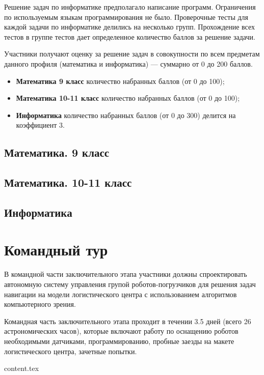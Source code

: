 \documentclass[a4paper,12pt,oneside]{book}
\begin{document}
Решение задач по информатике предполагало написание программ.
Ограничения по используемым языкам программирования не было.
Проверочные тесты для каждой задачи по информатике делились на
несколько групп. Прохождение всех тестов в группе тестов дает
определенное количество баллов за решение задачи.

Участники получают оценку за решение задач в совокупности по
всем предметам данного профиля (математика и информатика) ---
суммарно от 0 до 200 баллов.

\begin{itemize}
    \item {\bf Математика 9 класс} количество набранных баллов
    (от 0 до 100);
    \item {\bf Математика 10-11 класс} количество набранных баллов
    (от 0 до 100);
    \item {\bf Информатика} количество набранных баллов (от 0 до
    300) делится на коэффициент 3.
\end{itemize}

\section{Математика. 9 класс}


\section{Математика. 10-11 класс}


\section{Информатика}


\chapter{Командный тур}

В командной части заключительного этапа участники должны
спроектировать автономную систему управления групой роботов-погрузчиков
для решения задач навигации на модели логистического центра с
использованием алгоритмов компьютерного зрения.

Командная часть заключительного этапа проходит в течении
3.5 дней (всего 26 астрономических часов), которые включают работу по
оснащению роботов необходимыми датчиками, программированию, пробные заезды
на макете логистического центра, зачетные попытки.

{content.tex}


\end{document}
